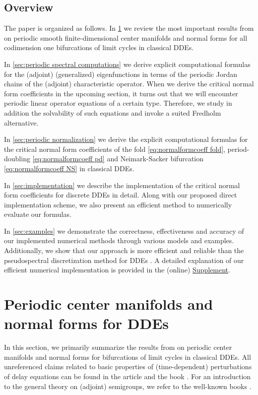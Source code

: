 \documentclass[english]{myarticle}
\begin{document}
\begin{sloppypar}
\subsection{Overview}
The paper is organized as follows. In \cref{sec:periodic center manifolds} we review the most important results from \cite{Article1,Article2} on periodic smooth finite-dimensional center manifolds and normal forms for all codimension one bifurcations of limit cycles in classical DDEs.

In \cref{sec:periodic spectral computations} we derive explicit computational formulas for the (adjoint) (generalized) eigenfunctions in terms of the periodic Jordan chains of the (adjoint) characteristic operator. When we derive the critical normal form coefficients in the upcoming section, it turns out that we will encounter periodic linear operator equations of a certain type. Therefore, we study in addition the solvability of such equations and invoke a suited Fredholm alternative.

In \cref{sec:periodic normalization} we derive the explicit computational formulas for the critical normal form coefficients of the fold \eqref{eq:normalformcoeff fold}, period-doubling \eqref{eq:normalformcoeff pd} and Neimark-Sacker bifurcation \eqref{eq:normalformcoeff NS} in classical DDEs.

In \cref{sec:implementation} we describe the implementation of the critical normal form coefficients for discrete DDEs in detail. Along with our proposed direct implementation scheme, we also present an efficient method to numerically evaluate our formulas. 

In \cref{sec:examples} we demonstrate the correctness, effectiveness and accuracy of our implemented numerical methods through various models and examples. Additionally, we show that our approach is more efficient and reliable than the pseudospectral discretization method for DDEs \cite{Breda2016,Breda2022,Breda2022b,Diekmann2020,Ando2022,Wolff2021}. A detailed explanation of our efficient numerical implementation is provided in the (online) \hyperlink{mysupplement}{Supplement}.

\section{Periodic center manifolds and normal forms for DDEs} \label{sec:periodic center manifolds}
In this section, we primarily summarize the results from \cite{Article1,Article2} on periodic center manifolds and normal forms for bifurcations of limit cycles in classical DDEs. All unreferenced claims related to basic properties of (time-dependent) perturbations of delay equations can be found in the article \cite{Clement1988} and the book \cite{Diekmann1995}. For an introduction to the general theory on (adjoint) semigroups, we refer to the well-known books \cite{Engel2000,Neerven1992}.


\end{sloppypar}
\end{document}
